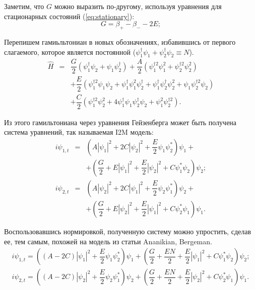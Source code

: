 \documentclass[12pt]{article}
\begin{document}
%
Заметим, что $G$ можно выразить по-другому, используя уравнения для стационарных состояний (\ref{eq:stationary}):
%
\begin{equation}
G = \beta_+ - \beta_- - 2E;
\end{equation}
%

Перепишем гамиьльтониан в новых обозначениях, избавившись от первого слагаемого, которое является постоянной ($\psi_1^\dag \psi_1 + \psi_2^\dag \psi_2 \equiv N$).
%
\begin{equation}
\begin{array}{lcl}
	\hat{H} & = & \dfrac{G}{2} (\psi_1^\dag \psi_2 +  \psi_1 \psi_2^\dag) + \dfrac{A}{2} (\psi_1^{\dag 2} \psi_1^2 + \psi_2^{\dag 2} \psi_2^2) \\[10pt]
	& & +\dfrac{E}{2} (\psi_1^{\dag 2} \psi_1 \psi_2 + \psi_1^\dag \psi_1^2 \psi_2^\dag + \psi_1^\dag \psi_2^\dag \psi_2^2 + \psi_1 \psi_2^{\dag 2} \psi_2) \\[10pt]
	& & +\dfrac{C}{2} (\psi_1^{\dag 2} \psi_2^2 + 4 \psi_1^\dag \psi_1 \psi_2^\dag \psi_2 + \psi_1^2 \psi_2^{\dag 2}).
\end{array}
\label{eq:hamiltonian}
\end{equation}
%

Из этого гамильтониана через уравнения Гейзенберга может быть получена система уравнений, так называемая I2M модель:
%
\begin{equation}
\begin{array}{lcl}
	i \psi_{1,t} & = & (A |\psi_1|^2 + 2C |\psi_2|^2 + \dfrac{E}{2} \psi_1 \psi_2^*) \psi_1 + \\[10pt]
	&& + (\dfrac{G}{2} + E |\psi_1|^2 + \dfrac{E}{2} |\psi_2|^2 + C \psi_1^* \psi_2) \psi_2; \\[10pt]
	i \psi_{2,t} & = & (A |\psi_2|^2 + 2C |\psi_1|^2 + \dfrac{E}{2} \psi_2 \psi_1^*) \psi_2 + \\[10pt] 
	&& + (\dfrac{G}{2} + E |\psi_2|^2 + \dfrac{E}{2}|\psi_1|^2 + C \psi_2^* \psi_1) \psi_1.
\end{array}
\label{eq:I2M}
\end{equation}
%

Воспользовавшись нормировкой, полученную систему можно упростить, сделав ее, тем самым, похожей на модель из статьи Ananikian, Bergeman.
%
\begin{equation*}
\begin{array}{c}
	i \psi_{1,t} = ((A - 2C) |\psi_1|^2 + \dfrac{E}{2} \psi_1 \psi_2^*) \psi_1 + (\dfrac{G}{2} + \dfrac{EN}{2} + \dfrac{E}{2} |\psi_1|^2 + C \psi_1^* \psi_2) \psi_2; \\[10pt]
	i \psi_{2,t} = ((A - 2C) |\psi_2|^2 + \dfrac{E}{2} \psi_2 \psi_1^*) \psi_2 + (\dfrac{G}{2} + \dfrac{EN}{2} + \dfrac{E}{2} |\psi_2|^2 + C \psi_2^* \psi_1) \psi_1.
\end{array}
\end{equation*}
%
\end{document}
